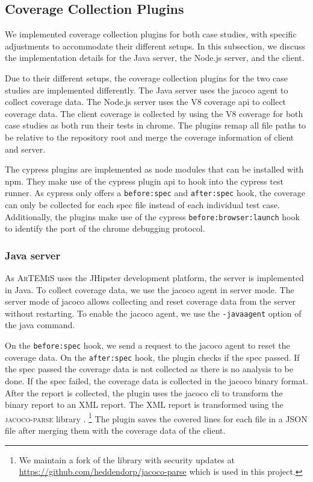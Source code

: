 \subsection{Coverage Collection Plugins}
We implemented coverage collection plugins for both case studies, with specific adjustments to accommodate their different setups. In this subsection, we discuss the implementation details for the Java server, the Node.js server, and the client.

Due to their different setups, the coverage collection plugins for the two case studies are implemented differently.
The Java server uses the jacoco agent to collect coverage data.
The Node.js server uses the V8 coverage \ac{api} to collect coverage data.
The client coverage is collected by using the V8 coverage for both case studies as both run their tests in chrome.
The plugins remap all file paths to be relative to the repository root and merge the coverage information of client and server.

The cypress plugins are implemented as node modules that can be installed with npm.
They make use of the cypress plugin \ac{api} \autocite{cypressio_writing_nodate} to hook into the cypress test runner.
As cypress only offers a \texttt{before:spec} and \texttt{after:spec} hook, the coverage can only be collected for each spec file instead of each individual test case.
Additionally, the plugins make use of the cypress \texttt{before:browser:launch} hook to identify the port of the chrome debugging protocol.
\subsubsection{Java server}
As \textsc{ArTEMiS} uses the JHipster \autocite{jhipster_jhipster_nodate} development platform, the server is implemented in Java.
To collect coverage data, we use the jacoco agent \autocite{noauthor_jacoco_nodate} in server mode.
The server mode of jacoco allows collecting and reset coverage data from the server without restarting.
To enable the jacoco agent, we use the \texttt{-javaagent} option of the java command.

On the \texttt{before:spec} hook, we send a request to the jacoco agent to reset the coverage data.
On the \texttt{after:spec} hook, the plugin checks if the spec passed.
If the spec passed the coverage data is not collected as there is no analysis to be done.
If the spec failed, the coverage data is collected in the jacoco binary format.
After the report is collected, the plugin uses the jacoco \ac{cli} to transform the binary report to an XML report.
The XML report is transformed using the \textsc{jacoco-parse} library \autocite{noauthor_jacoco-parse_2023}.
\footnote{We maintain a fork of the library with security updates at \url{https://github.com/heddendorp/jacoco-parse} which is used in this project.}
The plugin saves the covered lines for each file in a JSON file after merging them with the coverage data of the client.

